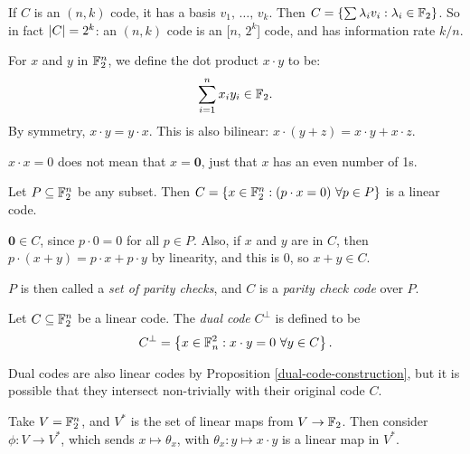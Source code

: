 \documentclass{article}
\begin{document}
\begin{corollary}
    If $C$ is an $(n, k)$ code, it has a basis $v_1, \, \dots, \, v_k$.
    Then $C = \left\lbrace \sum \lambda_i v_i : \lambda_i \in \mathbb{F}_2 \right\rbrace$.
    So in fact $\left\lvert C \right\rvert = 2^k$: an $(n, k)$ code is an [$n$, $2^k$] code,
    and has information rate $k/n$.
\end{corollary}

\begin{definition}
    For $x$ and $y$ in $\mathbb{F}_2^n$, we define the dot product $x \cdot y$ to be:
    \[
	\sum_{i=1}^n x_i y_i \in \mathbb{F}_2.
	\]
	By symmetry, $x \cdot y = y \cdot x$.
	This is also bilinear: $x \cdot (y + z) = x \cdot y + x \cdot z$.
\end{definition}

\begin{note}
	$x \cdot x = 0$ does not mean that $x = \textbf{0}$,
	just that $x$ has an even number of 1s.
\end{note}

\begin{proposition}
	\label{dual-code-construction}
    Let $P \subseteq \mathbb{F}_2^n$ be any subset. Then
	$C = \left\lbrace x \in \mathbb{F}_2^n : (p \cdot x = 0) \ \forall p \in P \right\rbrace$
	is a linear code.
\end{proposition}
\begin{prf}
    $\textbf{0} \in C$, since $p \cdot 0 = 0$ for all $p \in P$.
    Also, if $x$ and $y$ are in $C$, then
    $p \cdot (x + y) = p \cdot x + p \cdot y$
    by linearity, and this is 0, so $x + y \in C$.
\end{prf}

\begin{note}
	$P$ is then called a \textit{set of parity checks},
	and $C$ is a \textit{parity check code} over $P$.
\end{note}

\begin{definition}
    Let $C \subseteq \mathbb{F}_2^n$ be a linear code.
    The \textit{dual code} $C^\bot$ is defined to be
    \[
	C^\bot = \left\lbrace x \in \mathbb{F}^2_n : x \cdot y = 0 \ \forall y \in C \right\rbrace.
	\]
\end{definition}

\begin{note}
	Dual codes are also linear codes by Proposition \ref{dual-code-construction},
	but it is possible that they intersect non-trivially with their original code $C$.
\end{note}

Take $V = \mathbb{F}_2^n$, and $V^*$ is the set of linear maps from $V \to \mathbb{F}_2$.
Then consider $\phi : V \to V^*$, which sends $x \mapsto \theta_x$,
with $\theta_x : y \mapsto x \cdot y$ is a linear map in $V^*$.
\end{document}
